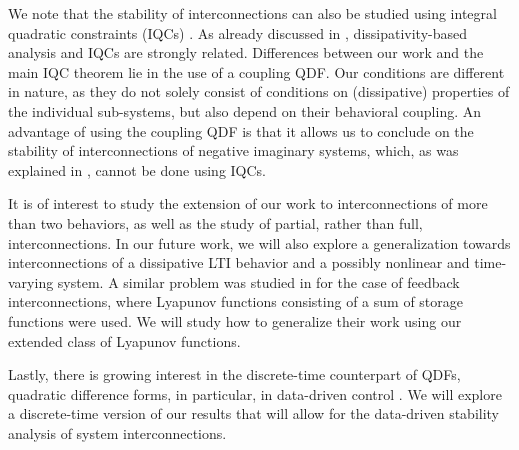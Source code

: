 \documentclass[letterpaper, 10 pt, conference]{ieeeconf}
\theoremstyle{ieeeconf}
\begin{document}
We note that the stability of interconnections can also be studied using integral quadratic constraints (IQCs) \cite{megretski_system_1997}. As already discussed in \cite{seiler_stability_2015,scherer_dissipativity_2022}, dissipativity-based analysis and IQCs are strongly related. Differences between our work and the main IQC theorem \cite[Theorem~1]{megretski_system_1997} lie in the use of a coupling QDF. Our conditions are different in nature, as they do not solely consist of conditions on (dissipative) properties of the individual sub-systems, but also depend on their behavioral coupling. 
An advantage of using the coupling QDF is that it allows us to conclude on the stability of interconnections of negative imaginary systems, which, as was explained in \cite{lanzon_stability_2008}, cannot be done using IQCs.

It is of interest to study the extension of our work to interconnections of more than two behaviors, as well as the study of partial, rather than full, interconnections. In our future work, we will also explore a generalization towards interconnections of a dissipative LTI behavior and a possibly nonlinear and time-varying system.
A similar problem was studied in \cite{takaba_stability_2005,willems_dissipativity_2007} for the case of feedback interconnections, where Lyapunov functions consisting of a sum of storage functions were used. We will study how to generalize their work using our extended class of Lyapunov functions.

Lastly, there is growing interest in the discrete-time counterpart of QDFs, quadratic difference forms, in particular, in data-driven control \cite{van_waarde_behavioral_2024,maupong_lyapunov_2017,rosa_one-shot_2021}. We will explore a discrete-time version of our results that will allow for the data-driven stability analysis of system interconnections.
\end{document}
